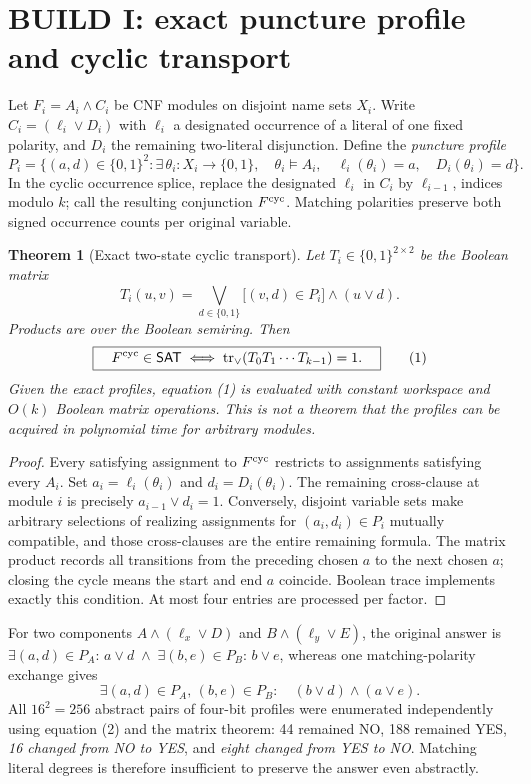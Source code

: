 \documentclass[11pt]{article}
\newtheorem{theorem}{Theorem}
\newcommand{\SAT}{\mathsf{SAT}}
\begin{document}
\section{BUILD I: exact puncture profile and cyclic transport}
Let $F_i=A_i\land C_i$ be CNF modules on disjoint name sets $X_i$. Write $C_i=(\ell_i\lor D_i)$ with $\ell_i$ a designated occurrence of a literal of one fixed polarity, and $D_i$ the remaining two-literal disjunction. Define the \emph{puncture profile}
\[
P_i=\{(a,d)\in\{0,1\}^2: \exists\,\theta_i:X_i\to\{0,1\},\quad \theta_i\models A_i,\quad \ell_i(\theta_i)=a,\quad D_i(\theta_i)=d\}.
\]
In the cyclic occurrence splice, replace the designated $\ell_i$ in $C_i$ by $\ell_{i-1}$, indices modulo $k$; call the resulting conjunction $F^{\rm cyc}$. Matching polarities preserve both signed occurrence counts per original variable.
\begin{theorem}[Exact two-state cyclic transport]\label{th:transfer}
Let $T_i\in\{0,1\}^{2\times2}$ be the Boolean matrix
\[
T_i(u,v)=\bigvee_{d\in\{0,1\}}\bigl[(v,d)\in P_i\bigr]\wedge(u\vee d).
\]
Products are over the Boolean semiring. Then
\[
\boxed{\quad F^{\rm cyc}\in\SAT\iff\operatorname{tr}_{\lor}(T_0T_1\cdots T_{k-1})=1.\quad}\tag{1}
\]
Given the exact profiles, equation (1) is evaluated with constant workspace and $O(k)$ Boolean matrix operations. This is \emph{not} a theorem that the profiles can be acquired in polynomial time for arbitrary modules.
\end{theorem}
\begin{proof}
Every satisfying assignment to $F^{\rm cyc}$ restricts to assignments satisfying every $A_i$. Set $a_i=\ell_i(\theta_i)$ and $d_i=D_i(\theta_i)$. The remaining cross-clause at module $i$ is precisely $a_{i-1}\vee d_i=1$. Conversely, disjoint variable sets make arbitrary selections of realizing assignments for $(a_i,d_i)\in P_i$ mutually compatible, and those cross-clauses are the entire remaining formula. The matrix product records all transitions from the preceding chosen $a$ to the next chosen $a$; closing the cycle means the start and end $a$ coincide. Boolean trace implements exactly this condition. At most four entries are processed per factor.\end{proof}

For two components $A\land(\ell_x\lor D)$ and $B\land(\ell_y\lor E)$, the original answer is
\(\exists (a,d)\in P_A:\,a\vee d\;\land\;\exists(b,e)\in P_B:\,b\vee e\),
whereas one matching-polarity exchange gives
\[
\exists(a,d)\in P_A,\,(b,e)\in P_B:\quad (b\vee d)\wedge(a\vee e).
\tag{2}
\]
All $16^2=256$ abstract pairs of four-bit profiles were enumerated independently using equation (2) and the matrix theorem: 44 remained NO, 188 remained YES, \emph{16 changed from NO to YES}, and \emph{eight changed from YES to NO}. Matching literal degrees is therefore insufficient to preserve the answer even abstractly.
\end{document}
